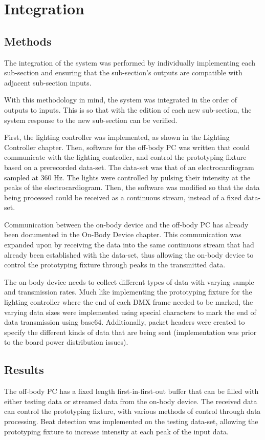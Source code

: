 \chapter{Integration}
\section{Methods}
The integration of the system was performed by individually implementing each sub-section
and ensuring that the sub-section's outputs are compatible with adjacent sub-section inputs.

With this methodology in mind, the system was integrated in the order of outputs to inputs.
This is so that with the edition of each new sub-section, the system response to the new sub-section can be verified.

First, the lighting controller was implemented, as shown in the Lighting Controller chapter.
Then, software for the off-body PC was written that could communicate with the lighting controller,
and control the prototyping fixture based on a prerecorded data-set.
The data-set was that of an electrocardiogram sampled at 360 Hz.
The lights were controlled by pulsing their intensity at the peaks of the electrocardiogram.
Then, the software was modified so that the data being processed could be received as a continuous stream, instead of a fixed data-set.

Communication between the on-body device and the off-body PC has already been documented in the On-Body Device chapter.
This communication was expanded upon by receiving the data into the same continuous stream that had already been established with the data-set,
thus allowing the on-body device to control the prototyping fixture through peaks in the transmitted data.

The on-body device needs to collect different types of data with varying sample and transmission rates.
Much like implementing the prototyping fixture for the lighting controller where the end of each DMX frame needed to be marked,
the varying data sizes were implemented using special characters to mark the end of data transmission using base64.
Additionally, packet headers were created to specify the different kinds of data that are being sent
(implementation was prior to the board power distribution issues).


\section{Results}
The off-body PC has a fixed length first-in-first-out buffer that can be filled with either testing data or streamed data from the on-body device.
The received data can control the prototyping fixture, with various methods of control through data processing.
Beat detection was implemented on the testing data-set,
allowing the prototyping fixture to increase intensity at each peak of the input data.

